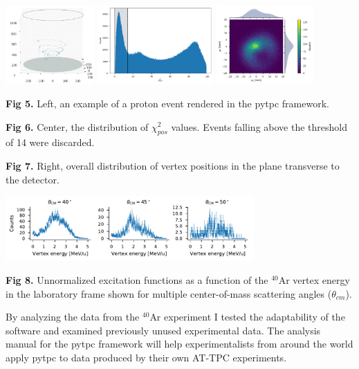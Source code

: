 \documentclass[ansiepaper,portrait]{baposter}
\begin{document}
\begin{poster}
{\begin{center}
\includegraphics[height=30mm]{chamber_plot.png}
\hspace{.75cm}
\includegraphics [height=30mm] {chi2pos.pdf}
\hspace{.75cm}
\includegraphics [height=30mm] {vertex_pos_distrib.pdf}
\end{center}

\small{\textbf{Fig 5.} Left, an example of a proton event rendered in the pytpc framework.}

\small{\textbf{Fig 6.} Center, the distribution of $\chi_{pos}^{2}$ values. Events falling above the threshold of 14 were discarded.}

\small{\textbf{Fig 7.} Right, overall distribution of vertex positions in the plane transverse to the detector.}

\begin{center}
\includegraphics [width=95mm] {angular_excitation_hists_POSTER.pdf}
\end{center}
\small{\textbf{Fig 8.} Unnormalized excitation functions as a function of the $^{40}$Ar vertex energy in the laboratory frame shown for multiple center-of-mass scattering angles ($\theta_{cm}$).}
}

{\small{ By analyzing the data from the $^{40}$Ar experiment I tested the adaptability of the software and examined previously unused experimental data. The analysis manual for the pytpc framework will help experimentalists from around the world apply pytpc to data produced by their own AT-TPC experiments.

}}
\end{poster}
\end{document}
